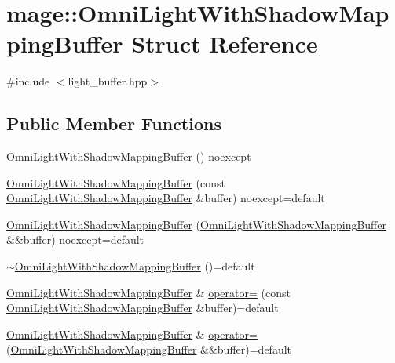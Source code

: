 \hypertarget{structmage_1_1_omni_light_with_shadow_mapping_buffer}{}\section{mage\+:\+:Omni\+Light\+With\+Shadow\+Mapping\+Buffer Struct Reference}
\label{structmage_1_1_omni_light_with_shadow_mapping_buffer}


{\ttfamily \#include $<$light\+\_\+buffer.\+hpp$>$}

\subsection*{Public Member Functions}
\begin{DoxyCompactItemize}
\item 
\hyperlink{structmage_1_1_omni_light_with_shadow_mapping_buffer_a45f8c34629b1458b04786458416fda40}{Omni\+Light\+With\+Shadow\+Mapping\+Buffer} () noexcept
\item 
\hyperlink{structmage_1_1_omni_light_with_shadow_mapping_buffer_a062c7d94f3d6350f32c74ed27bbeb986}{Omni\+Light\+With\+Shadow\+Mapping\+Buffer} (const \hyperlink{structmage_1_1_omni_light_with_shadow_mapping_buffer}{Omni\+Light\+With\+Shadow\+Mapping\+Buffer} \&buffer) noexcept=default
\item 
\hyperlink{structmage_1_1_omni_light_with_shadow_mapping_buffer_a57dadfe29fd43f87713b755c15277cdf}{Omni\+Light\+With\+Shadow\+Mapping\+Buffer} (\hyperlink{structmage_1_1_omni_light_with_shadow_mapping_buffer}{Omni\+Light\+With\+Shadow\+Mapping\+Buffer} \&\&buffer) noexcept=default
\item 
\hyperlink{structmage_1_1_omni_light_with_shadow_mapping_buffer_ac28ea25ecb8f27be2403c37a16fd9631}{$\sim$\+Omni\+Light\+With\+Shadow\+Mapping\+Buffer} ()=default
\item 
\hyperlink{structmage_1_1_omni_light_with_shadow_mapping_buffer}{Omni\+Light\+With\+Shadow\+Mapping\+Buffer} \& \hyperlink{structmage_1_1_omni_light_with_shadow_mapping_buffer_ab94e93f02ca982d85be2bd8da2714c01}{operator=} (const \hyperlink{structmage_1_1_omni_light_with_shadow_mapping_buffer}{Omni\+Light\+With\+Shadow\+Mapping\+Buffer} \&buffer)=default
\item 
\hyperlink{structmage_1_1_omni_light_with_shadow_mapping_buffer}{Omni\+Light\+With\+Shadow\+Mapping\+Buffer} \& \hyperlink{structmage_1_1_omni_light_with_shadow_mapping_buffer_ad7801e067fde2f54f0c328b2e34ed118}{operator=} (\hyperlink{structmage_1_1_omni_light_with_shadow_mapping_buffer}{Omni\+Light\+With\+Shadow\+Mapping\+Buffer} \&\&buffer)=default
\end{DoxyCompactItemize}
